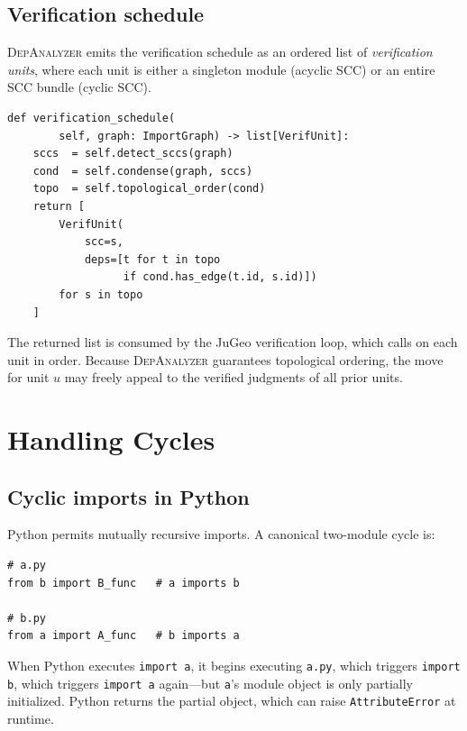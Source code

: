 \documentclass[11pt]{article}
\newcommand{\DA}{\textsc{DepAnalyzer}}     %
\begin{document}
\subsection{Verification schedule}

\DA{} emits the verification schedule as an ordered list of
\emph{verification units}, where each unit is either a singleton
module (acyclic SCC) or an entire SCC bundle (cyclic SCC).

\begin{lstlisting}[style=jugeo-python,
  caption={Generating the verification schedule in \DA.},
  label={lst:schedule}]
def verification_schedule(
        self, graph: ImportGraph) -> list[VerifUnit]:
    sccs  = self.detect_sccs(graph)
    cond  = self.condense(graph, sccs)
    topo  = self.topological_order(cond)
    return [
        VerifUnit(
            scc=s,
            deps=[t for t in topo
                  if cond.has_edge(t.id, s.id)])
        for s in topo
    ]
\end{lstlisting}

The returned list is consumed by the JuGeo verification loop, which
calls \VERIFY{} on each unit in order.  Because \DA{} guarantees
topological ordering, the \VERIFY{} move for unit $u$ may freely
appeal to the verified judgments of all prior units.

\section{Handling Cycles}
\label{sec:cycles}

\subsection{Cyclic imports in Python}

Python permits mutually recursive imports.  A canonical two-module
cycle is:

\begin{lstlisting}[style=jugeo-python,
  caption={Mutual import cycle between \texttt{a.py} and \texttt{b.py}.},
  label={lst:cycle}]
# a.py
from b import B_func   # a imports b

# b.py
from a import A_func   # b imports a
\end{lstlisting}

When Python executes \texttt{import a}, it begins executing
\texttt{a.py}, which triggers \texttt{import b}, which triggers
\texttt{import a} again—but \texttt{a}'s module object is only
partially initialized.  Python returns the partial object, which can
raise \texttt{AttributeError} at runtime.
\end{document}
